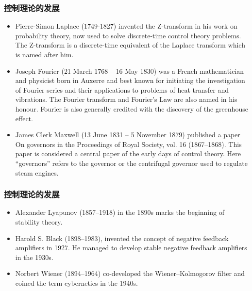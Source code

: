 \documentclass{beamer}
\begin{document}
\begin{frame}
\frametitle{控制理论的发展}
\label{sec-1-7}

\begin{itemize}
\item <1> Pierre-Simon Laplace (1749-1827) invented the Z-transform in his work on probability theory, now used to solve discrete-time control theory problems. The Z-transform is a discrete-time equivalent of the Laplace transform which is named after him.
\item <2> Joseph Fourier (21 March 1768 – 16 May 1830) was a French mathematician and physicist born in Auxerre and best known for initiating the investigation of Fourier series and their applications to problems of heat transfer and vibrations. The Fourier transform and Fourier's Law are also named in his honour. Fourier is also generally credited with the discovery of the greenhouse effect.
\item <3> James Clerk Maxwell (13 June 1831 – 5 November 1879) published a paper On governors in the Proceedings of Royal Society, vol. 16 (1867–1868). This paper is considered a central paper of the early days of control theory. Here ``governors'' refers to the governor or the centrifugal governor used to regulate steam engines.
\end{itemize}
\end{frame}
\begin{frame}
\frametitle{控制理论的发展}
\label{sec-1-8}

\begin{itemize}
\item <1> Alexander Lyapunov (1857–1918) in the 1890s marks the beginning of stability theory.
\item <2> Harold S. Black (1898–1983), invented the concept of negative feedback amplifiers in 1927. He managed to develop stable negative feedback amplifiers in the 1930s.
\item <3> Norbert Wiener (1894–1964) co-developed the Wiener–Kolmogorov filter and coined the term cybernetics in the 1940s.
\end{itemize}
\end{frame}
\end{document}
